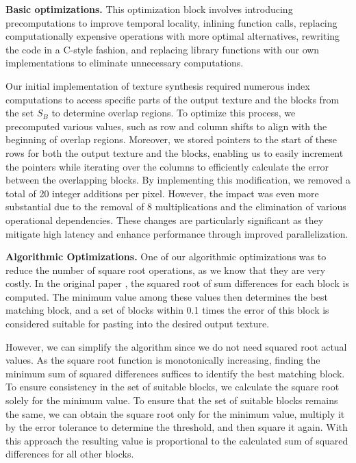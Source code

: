 \documentclass[letterpaper]{article}
\newcommand{\mypar}[1]{{\bf #1.}}
\begin{document}
\mypar{Basic optimizations}
This optimization block involves introducing precomputations to improve temporal locality, inlining function calls, replacing computationally expensive operations with more optimal alternatives, rewriting the code in a C-style fashion, and replacing library functions with our own implementations to eliminate unnecessary computations.

Our initial implementation of texture synthesis required numerous index computations to access specific parts of the output texture and the blocks from the set \textit{$S_{B}$} to determine overlap regions. To optimize this process, we precomputed various values, such as row and column shifts to align with the beginning of overlap regions. Moreover, we stored pointers to the start of these rows for both the output texture and the blocks, enabling us to easily increment the pointers while iterating over the columns to efficiently calculate the error between the overlapping blocks. By implementing this modification, we removed a total of 20 integer additions per pixel. However, the impact was even more substantial due to the removal of 8 multiplications and the elimination of various operational dependencies. These changes are particularly significant as they mitigate high latency and enhance performance through improved parallelization.

\mypar{Algorithmic Optimizations} One of our algorithmic optimizations was to reduce the number of square root operations, as we know that they are very costly. In the original paper \cite{Efros:01}, the squared root of sum differences for each block is computed. The minimum value among these values then determines the best matching block, and a set of blocks within 0.1 times the error of this block is considered suitable for pasting into the desired output texture.

However, we can simplify the algorithm since we do not need squared root actual values. As the square root function is monotonically increasing, finding the minimum sum of squared differences suffices to identify the best matching block. To ensure consistency in the set of suitable blocks, we calculate the square root solely for the minimum value. To ensure that the set of suitable blocks remains the same, we can obtain the square root only for the minimum value, multiply it by the error tolerance to determine the threshold, and then square it again. With this approach the resulting value is proportional to the calculated sum of squared differences for all other blocks.
\end{document}

